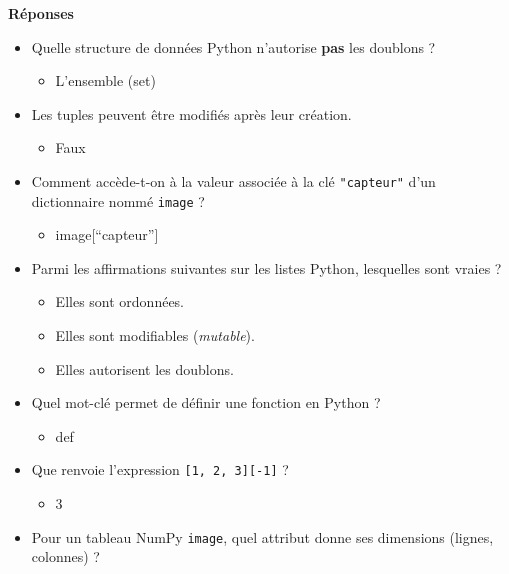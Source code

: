 \documentclass[
  french,
  11pt,
  letterpaper,
  open=any,
  twoside=false,
  french]{scrbook}
\providecommand{\tightlist}{%
  \setlength{\itemsep}{0pt}\setlength{\parskip}{0pt}}
\begin{document}
\textbf{Réponses}

\begin{itemize}
\tightlist
\item
  Quelle structure de données Python n'autorise \textbf{pas} les
  doublons ?

  \begin{itemize}
  \tightlist
  \item
    L'ensemble (set)
  \end{itemize}
\item
  Les tuples peuvent être modifiés après leur création.

  \begin{itemize}
  \tightlist
  \item
    Faux
  \end{itemize}
\item
  Comment accède-t-on à la valeur associée à la clé \texttt{"capteur"}
  d'un dictionnaire nommé \texttt{image} ?

  \begin{itemize}
  \tightlist
  \item
    image{[}``capteur''{]}
  \end{itemize}
\item
  Parmi les affirmations suivantes sur les listes Python, lesquelles
  sont vraies ?

  \begin{itemize}
  \tightlist
  \item
    Elles sont ordonnées.
  \item
    Elles sont modifiables (\emph{mutable}).
  \item
    Elles autorisent les doublons.
  \end{itemize}
\item
  Quel mot-clé permet de définir une fonction en Python ?

  \begin{itemize}
  \tightlist
  \item
    def
  \end{itemize}
\item
  Que renvoie l'expression \texttt{{[}1,\ 2,\ 3{]}{[}-1{]}} ?

  \begin{itemize}
  \tightlist
  \item
    3
  \end{itemize}
\item
  Pour un tableau NumPy \texttt{image}, quel attribut donne ses
  dimensions (lignes, colonnes) ?


\end{itemize}
\end{document}
